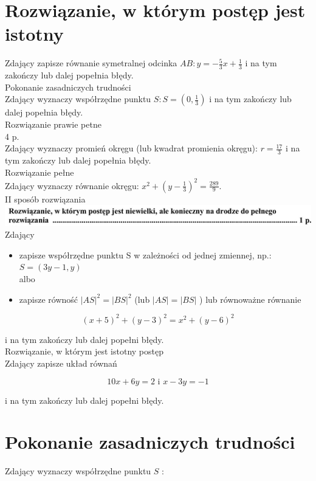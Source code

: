 \documentclass[10pt]{article}
\begin{document}
\section*{Rozwiązanie, w którym postęp jest istotny}
Zdający zapisze równanie symetralnej odcinka $A B: y=-\frac{5}{3} x+\frac{1}{3}$ i na tym zakończy lub dalej popełnia błędy.\\
Pokonanie zasadniczych trudności\\
Zdający wyznaczy współrzędne punktu $S: S=\left(0, \frac{1}{3}\right)$ i na tym zakończy lub dalej popełnia błędy.\\
Rozwiązanie prawie petne\\
4 p.\\
Zdający wyznaczy promień okręgu (lub kwadrat promienia okręgu): $r=\frac{17}{3}$ i na tym zakończy lub dalej popełnia błędy.\\
Rozwiązanie pełne\\
Zdający wyznaczy równanie okręgu: $x^{2}+\left(y-\frac{1}{3}\right)^{2}=\frac{289}{9}$.\\
II sposób rozwiązania\\
\includegraphics[max width=\textwidth, center]{2025_02_07_cd06b1485e4d114dda29g-25}\\
Zdający

\begin{itemize}
  \item zapisze współrzędne punktu S w zależności od jednej zmiennej, np.: $S=(3 y-1, y)$\\
albo
  \item zapisze równość $|A S|^{2}=|B S|^{2}$ (lub $|A S|=|B S|$ ) lub równoważne równanie
\end{itemize}

$$
(x+5)^{2}+(y-3)^{2}=x^{2}+(y-6)^{2}
$$

i na tym zakończy lub dalej popełni błędy.\\
Rozwiązanie, w którym jest istotny postęp\\
Zdający zapisze układ równań

$$
10 x+6 y=2 \text { i } x-3 y=-1
$$

i na tym zakończy lub dalej popełni błędy.

\section*{Pokonanie zasadniczych trudności}
Zdający wyznaczy współrzędne punktu $S$ :
\end{document}
